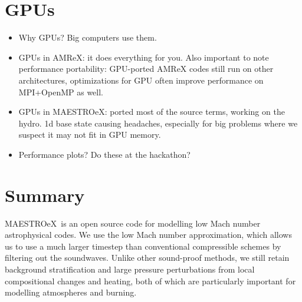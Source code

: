 \documentclass[a4paper]{jpconf}
\newcommand{\maestroex}{{\sffamily MAESTROeX}}
\newcommand{\amrex}{{\sffamily AMReX}}
\begin{document}


\section{GPUs} \label{sec:gpus}

\begin{itemize}
    \item Why GPUs? Big computers use them.
    \item GPUs in \amrex: it does everything for you. Also important to note performance portability: GPU-ported AMReX codes still run on other architectures, optimizations for GPU often improve performance on MPI+OpenMP as well.
    \item GPUs in \maestroex: ported most of the source terms, working on the hydro. 1d base state causing headaches, especially for big problems where we suspect it may not fit in GPU memory.
    \item Performance plots? Do these at the hackathon?
\end{itemize}


\section{Summary} \label{sec:summary}

\maestroex~is an open source code for modelling low Mach number astrophysical codes. We use the low Mach number approximation, which allows us to use a much larger timestep than conventional compressible schemes by filtering out the soundwaves. Unlike other sound-proof methods, we still retain background stratification and large pressure perturbations from local compositional changes and heating, both of which are particularly important for modelling atmospheres and burning. 
\end{document}
